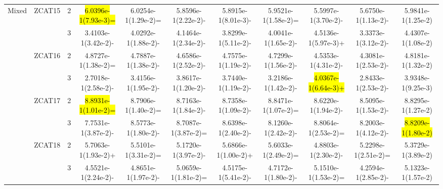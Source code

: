 \documentclass[a4paper,fleqn]{cas-dc}
\newcommand{\highlight}[1]{
	\begingroup
	\sethlcolor{Seashell}%
	\hl{#1}%
	\endgroup
}
\begin{document}
\begin{sloppypar}
\begin{table}[ht]
{\begin{tabular}{ccccccccccc}
					
					
					
					\multirow{12}{*}{Mixed}&\multirow{2}{*}{ZCAT15}&2			&\highlight{6.0396e-1(7.93e-3)=}	 &6.0254e-1(1.29e-2)=	&5.8596e-1(2.22e-2)-	&5.8915e-1(8.01e-3)-	&5.9521e-1(1.58e-2)=	&5.5997e-1(3.70e-2)-	&5.6750e-1(1.13e-2)-	&5.9841e-1(1.25e-2)\\
					
					\multirow{12}{*}{~}&\multirow{2}{*}{~}&3	&3.4103e-1(3.42e-2)-		&4.0292e-1(1.88e-2)-	&4.1464e-1(2.34e-2)-	&3.8299e-1(5.11e-2)-	&4.0041e-1(1.65e-2)-	&4.5136e-1(5.97e-3)+	&3.3373e-1(3.12e-2)-	&4.4307e-1(1.08e-2)\\
					
					
					
					
					
					
					\multirow{12}{*}{~}&\multirow{2}{*}{ZCAT16}&2 	&4.8727e-1(1.38e-2)=		&4.7887e-1(1.38e-2)-	&4.6586e-1(2.52e-2)-	&4.7575e-1(1.19e-2)-	&4.7299e-1(1.56e-2)-	&4.5353e-1(4.31e-2)-	&4.3081e-1(2.53e-2)-	&4.8181e-1(1.32e-2)\\
					
					\multirow{12}{*}{~}&\multirow{2}{*}{~}&3		&2.7018e-1(2.58e-2)-	&3.4156e-1(1.95e-2)-	&3.8617e-1(1.20e-2)-	&3.7440e-1(1.19e-2)-	&3.2186e-1(1.42e-2)-	&\highlight{4.0367e-1(6.64e-3)+}	&2.8433e-1(2.53e-2)-	&3.9348e-1(9.25e-3)\\
					
					
					
					\multirow{12}{*}{~}&\multirow{2}{*}{ZCAT17}&2	&\highlight{8.8931e-1(1.01e-2)=}		&8.7906e-1(1.40e-2)=	&8.7163e-1(1.84e-2)-	&8.7358e-1(1.09e-2)-	&8.8471e-1(1.07e-2)=	&8.6220e-1(1.94e-2)-	&8.5095e-1(1.53e-2)-	&8.8295e-1(1.27e-2)\\
					
					\multirow{12}{*}{~}&\multirow{2}{*}{~}&3		&7.7531e-1(3.87e-2)-		&8.5773e-1(1.80e-2)-	&8.7087e-1(3.87e-2)=	&8.6398e-1(2.40e-2)-	&8.1260e-1(2.42e-2)-	&8.8064e-1(2.53e-2)=	&8.2003e-1(4.12e-2)-	&\highlight{8.8209e-1(1.80e-2)}\\
					
					
					
					
					
					
					\multirow{12}{*}{~}&\multirow{2}{*}{ZCAT18}&2 &5.7063e-1(1.93e-2)+	&5.5101e-1(3.31e-2)=	&5.1720e-1(3.97e-2)-	&5.6866e-1(1.00e-2)+	&5.6033e-1(2.49e-2)=	&4.8803e-1(2.30e-2)-	&5.2298e-1(2.51e-2)=	&5.3729e-1(3.89e-2)\\
					
					\multirow{12}{*}{~}&\multirow{2}{*}{~}&3 &4.5521e-1(2.24e-2)-		&4.8651e-1(1.97e-2)-	&5.0659e-1(1.81e-2)=	&4.5175e-1(5.41e-2)-	&4.7172e-1(1.80e-2)-	&5.1510e-1(1.53e-2)=	&4.2594e-1(2.85e-2)-	&5.1323e-1(1.57e-2)\\
					

\end{tabular}}
\end{table}
\end{sloppypar}
\end{document}
